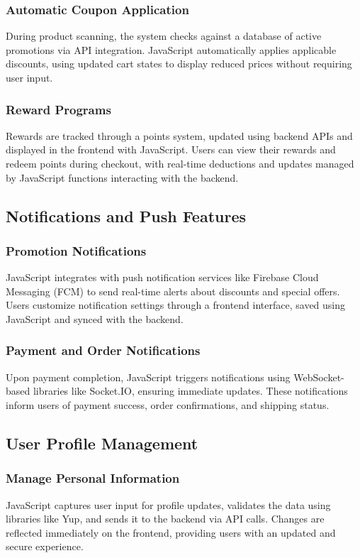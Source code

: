 \documentclass[conference]{IEEEtran}
\begin{document}
\subsubsection{Automatic Coupon Application}
During product scanning, the system checks against a database of active promotions via API integration. JavaScript automatically applies applicable discounts, using updated cart states to display reduced prices without requiring user input.
\subsubsection{Reward Programs}
Rewards are tracked through a points system, updated using backend APIs and displayed in the frontend with JavaScript. Users can view their rewards and redeem points during checkout, with real-time deductions and updates managed by JavaScript functions interacting with the backend.
\subsection{Notifications and Push Features}
\subsubsection{Promotion Notifications}
JavaScript integrates with push notification services like Firebase Cloud Messaging (FCM) to send real-time alerts about discounts and special offers. Users customize notification settings through a frontend interface, saved using JavaScript and synced with the backend.
\subsubsection{Payment and Order Notifications}
Upon payment completion, JavaScript triggers notifications using WebSocket-based libraries like Socket.IO, ensuring immediate updates. These notifications inform users of payment success, order confirmations, and shipping status.

\subsection{User Profile Management}
\subsubsection{Manage Personal Information}
JavaScript captures user input for profile updates, validates the data using libraries like Yup, and sends it to the backend via API calls. Changes are reflected immediately on the frontend, providing users with an updated and secure experience.
\end{document}

